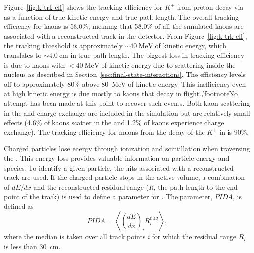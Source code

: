 Figure~\ref{fig:k-trk-eff} shows the tracking efficiency for $K^{+}$  from proton decay via \ptoknubar as a function of true kinetic energy and true path length. The overall tracking efficiency for kaons is \num{58.0}\%, meaning that \num{58.0}\% of all the simulated kaons are associated with a reconstructed track in the detector.  From Figure~\ref{fig:k-trk-eff}, the tracking threshold is approximately $\sim\SI{40}{\MeV}$ of kinetic energy, which translates to $\sim\SI{4.0}{\cm}$ in true path length.  The biggest loss in tracking efficiency is due to kaons with $<\SI{40}{\MeV}$ of kinetic energy due to scattering inside the nucleus as described in Section~\ref{sec:final-state-interactions}.  The efficiency levels off to approximately \num{80}\% above \SI{80}{\MeV} of kinetic energy.  This inefficiency even at high kinetic energy is due mostly to kaons that decay in flight./footnote{No attempt has been made at this point to recover such events.}
Both kaon scattering in the  and charge exchange are included in the simulation but are relatively small effects (\num{4.6}\% of kaons scatter in the  and \num{1.2}\% of kaons experience charge exchange).   The tracking efficiency for muons from the decay of the $K^{+}$ in \ptoknubar is \num{90}\%.

Charged particles lose energy through ionization and scintillation when traversing the . This energy loss provides valuable information on particle energy and species. To identify a given particle, the hits associated with a reconstructed track are used.
If the charged particle stops in the  active volume, a combination of $dE/dx$ and the reconstructed residual range ($R$, the path length to the end point of the track) is used to define a parameter for .  The parameter, $PIDA$, %
is defined as~\cite{Acciarri:2013met}  
%
\begin{equation}
PIDA = \left\langle \left(\frac{dE}{dx}\right)_{i}R^{0.42}_{i}\right\rangle,\label{eqn:PIDA}
\end{equation}
where the median is taken over all track points $i$ for which the residual range $R_i$ is less than \SI{30}{\cm}.

